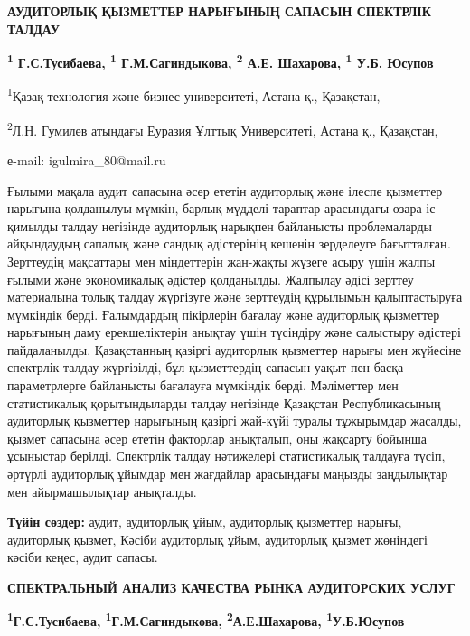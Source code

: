 \begin{articleheader}
{\bfseries АУДИТОРЛЫҚ ҚЫЗМЕТТЕР НАРЫҒЫНЫҢ САПАСЫН СПЕКТРЛІК ТАЛДАУ}

{\bfseries \textsuperscript{1} Г.С.Тусибаева\textsuperscript{\envelope},
\textsuperscript{1} Г.М.Сагиндыкова, \textsuperscript{2} А.Е. Шахарова,
\textsuperscript{1} У.Б. Юсупов}
\end{articleheader}

\begin{affiliation}

\textsuperscript{1}Қазақ технология және бизнес университеті, Астана қ.,
Қазақстан,

\textsuperscript{2}Л.Н. Гумилев атындағы Еуразия Ұлттық Университеті,
Астана қ., Қазақстан,

е-mail: igulmira\_80@mail.ru
\end{affiliation}

Ғылыми мақала аудит сапасына әсер ететін аудиторлық және ілеспе
қызметтер нарығына қолданылуы мүмкін, барлық мүдделі тараптар арасындағы
өзара іс-қимылды талдау негізінде аудиторлық нарықпен байланысты
проблемаларды айқындаудың сапалық және сандық әдістерінің кешенін
зерделеуге бағытталған\emph{.} Зерттеудің мақсаттары мен міндеттерін
жан-жақты жүзеге асыру үшін жалпы ғылыми және экономикалық әдістер
қолданылды. Жалпылау әдісі зерттеу материалына толық талдау жүргізуге
және зерттеудің құрылымын қалыптастыруға мүмкіндік берді. Ғалымдардың
пікірлерін бағалау және аудиторлық қызметтер нарығының даму
ерекшеліктерін анықтау үшін түсіндіру және салыстыру әдістері
пайдаланылды. Қазақстанның қазіргі аудиторлық қызметтер нарығы мен
жүйесіне спектрлік талдау жүргізілді, бұл қызметтердің сапасын уақыт пен
басқа параметрлерге байланысты бағалауға мүмкіндік берді. Мәліметтер мен
статистикалық қорытындыларды талдау негізінде Қазақстан Республикасының
аудиторлық қызметтер нарығының қазіргі жай-күйі туралы тұжырымдар
жасалды, қызмет сапасына әсер ететін факторлар анықталып, оны жақсарту
бойынша ұсыныстар берілді. Спектрлік талдау нәтижелері статистикалық
талдауға түсіп, әртүрлі аудиторлық ұйымдар мен жағдайлар арасындағы
маңызды заңдылықтар мен айырмашылықтар анықталды.

\textbf{Түйін сөздер:} аудит, аудиторлық ұйым, аудиторлық қызметтер
нарығы, аудиторлық қызмет, Кәсіби аудиторлық ұйым, аудиторлық қызмет
жөніндегі кәсіби кеңес, аудит сапасы.

\begin{articleheader}
{\bfseries СПЕКТРАЛЬНЫЙ АНАЛИЗ КАЧЕСТВА РЫНКА АУДИТОРСКИХ УСЛУГ}

{\bfseries \textsuperscript{1}Г.С.Тусибаева\textsuperscript{\envelope},
\textsuperscript{1}Г.М.Сагиндыкова, \textsuperscript{2}А.Е.Шахарова,
\textsuperscript{1}У.Б.Юсупов}
\end{articleheader}

